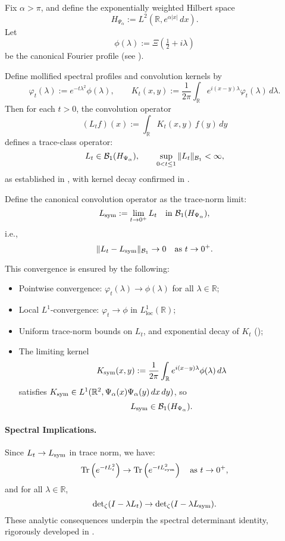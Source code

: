 \begin{lemma}
\label{lem:trace_norm_convergence_Lt_to_Lsym}
Fix \( \alpha > \pi \), and define the exponentially weighted Hilbert space
\[
H_{\Psi_\alpha} := L^2(\mathbb{R}, e^{\alpha|x|}\, dx).
\]
Let
\[
\phi(\lambda) := \Xi\left( \tfrac{1}{2} + i\lambda \right)
\]
be the canonical Fourier profile (see ).

Define mollified spectral profiles and convolution kernels by
\[
\varphi_t(\lambda) := e^{-t\lambda^2} \phi(\lambda), \qquad
K_t(x,y) := \frac{1}{2\pi} \int_{\mathbb{R}} e^{i(x - y)\lambda} \varphi_t(\lambda)\, d\lambda.
\]
Then for each \( t > 0 \), the convolution operator
\[
(L_t f)(x) := \int_{\mathbb{R}} K_t(x, y)\, f(y)\, dy
\]
defines a trace-class operator:
\[
L_t \in \mathcal{B}_1(H_{\Psi_\alpha}), \qquad \sup_{0 < t \le 1} \| L_t \|_{\mathcal{B}_1} < \infty,
\]
as established in , with kernel decay confirmed in .

\medskip
\noindent
Define the canonical convolution operator as the trace-norm limit:
\[
L_{\mathrm{sym}} := \lim_{t \to 0^+} L_t \quad \text{in } \mathcal{B}_1(H_{\Psi_\alpha}),
\]
i.e.,
\[
\| L_t - L_{\mathrm{sym}} \|_{\mathcal{B}_1} \to 0 \quad \text{as } t \to 0^+.
\]

\medskip
\noindent
This convergence is ensured by the following:
\begin{itemize}
  \item Pointwise convergence: \( \varphi_t(\lambda) \to \phi(\lambda) \) for all \( \lambda \in \mathbb{R} \);
  \item Local \( L^1 \)-convergence: \( \varphi_t \to \phi \) in \( L^1_{\mathrm{loc}}(\mathbb{R}) \);
  \item Uniform trace-norm bounds on \( L_t \), and exponential decay of \( K_t \) ();
  \item The limiting kernel
  \[
  K_{\mathrm{sym}}(x,y) := \frac{1}{2\pi} \int_{\mathbb{R}} e^{i(x-y)\lambda} \phi(\lambda)\, d\lambda
  \]
  satisfies \( K_{\mathrm{sym}} \in L^1(\mathbb{R}^2, \Psi_\alpha(x)\Psi_\alpha(y)\, dx\, dy) \), so
  \[
  L_{\mathrm{sym}} \in \mathcal{B}_1(H_{\Psi_\alpha}).
  \]
\end{itemize}

\paragraph{Spectral Implications.}
Since \( L_t \to L_{\mathrm{sym}} \) in trace norm, we have:
\[
\operatorname{Tr}\left(e^{-tL_t^2}\right) \to \operatorname{Tr}\left(e^{-tL_{\mathrm{sym}}^2}\right) \quad \text{as } t \to 0^+,
\]
and for all \( \lambda \in \mathbb{R} \),
\[
\det\nolimits_{\zeta}(I - \lambda L_t) \to \det\nolimits_{\zeta}(I - \lambda L_{\mathrm{sym}}).
\]
These analytic consequences underpin the spectral determinant identity, rigorously developed in .
\end{lemma}
